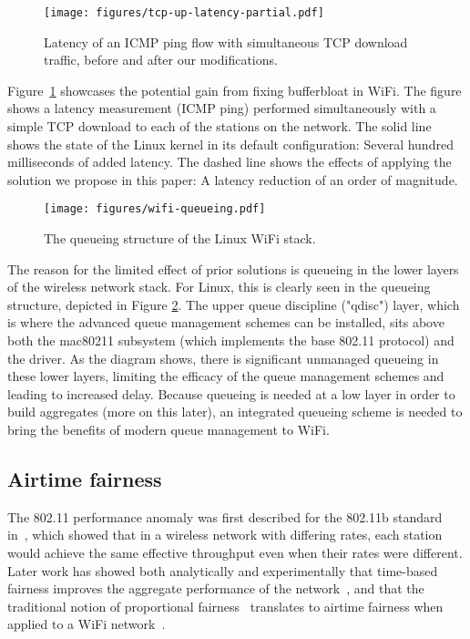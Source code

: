 \documentclass[english]{scrartcl}
\begin{document}
\begin{figure}[htbp]
\centering
\texttt{[image: figures/tcp-up-latency-partial.pdf]}
\caption{\label{fig:tcp-up-latency-partial}
Latency of an ICMP ping flow with simultaneous TCP download traffic, before and after our modifications.}
\end{figure}

Figure \ref{fig:tcp-up-latency-partial} showcases the potential gain from fixing
bufferbloat in WiFi. The figure shows a latency measurement (ICMP ping)
performed simultaneously with a simple TCP download to each of the stations on
the network. The solid line shows the state of the Linux kernel in its default
configuration: Several hundred milliseconds of added latency. The dashed line
shows the effects of applying the solution we propose in this paper: A latency
reduction of an order of magnitude.

\begin{figure}[htbp]
\centering
\texttt{[image: figures/wifi-queueing.pdf]}
\caption{\label{fig:linux-queue-pre}
The queueing structure of the Linux WiFi stack.}
\end{figure}

The reason for the limited effect of prior solutions is queueing in the lower
layers of the wireless network stack. For Linux, this is clearly seen in the
queueing structure, depicted in Figure \ref{fig:linux-queue-pre}. The upper queue
discipline ("qdisc") layer, which is where the advanced queue management schemes
can be installed, sits above both the mac80211 subsystem (which implements the
base 802.11 protocol) and the driver. As the diagram shows, there is significant
unmanaged queueing in these lower layers, limiting the efficacy of the queue
management schemes and leading to increased delay. Because queueing is needed at
a low layer in order to build aggregates (more on this later), an integrated
queueing scheme is needed to bring the benefits of modern queue management to
WiFi.

\subsection{Airtime fairness}
\label{sec:org2b86a95}
The 802.11 performance anomaly was first described for the 802.11b standard
in \cite{heusse_performance_2003}, which showed that in a wireless network with
differing rates, each station would achieve the same effective throughput even
when their rates were different. Later work has showed both analytically and
experimentally that time-based fairness improves the aggregate performance of
the network \cite{tan_time-based_2004}, and that the traditional notion of
proportional fairness \cite{laddomada_throughput_2010} translates to airtime
fairness when applied to a WiFi network \cite{jiang_proportional_2005}.
\end{document}
